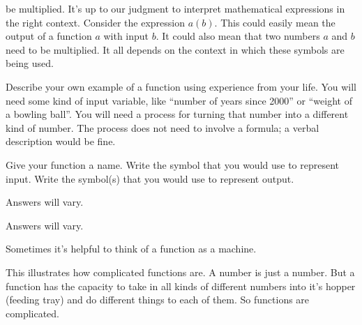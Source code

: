        		be multiplied. It's up to our judgment to interpret mathematical expressions in the
       		right context. Consider the expression $a(b)$. This could easily mean the output of
       		a function $a$ with input $b$. It could also mean that two numbers $a$ and $b$ need
       		to be multiplied. It all depends on the context in which these symbols are being used.
%
\begin{checkpoint}
\begin{problem}\label{}
Describe your own example of a function using experience from your life. You will need some 
                    kind of input variable, like ``number of years since 2000'' or ``weight of a bowling ball''. You will 
				need a process for turning that number into a different kind of number. The process does not need to
                		involve a formula; a verbal description would be fine.
%
\par Give your function a name. Write the symbol that you would use to represent
                		input. Write the symbol(s) that you would use to represent output.
%
\begin{longsolution}
%
Answers will vary.
%
\end{longsolution}
%
\begin{shortsolution}
%
Answers will vary.
%
\end{shortsolution}
%
\end{problem}
%
\end{checkpoint}
%
\par Sometimes it's helpful to think of a function as a machine.
%
\par This illustrates how complicated functions are. A number is just a number. But a function has the capacity to 
		take in all kinds of different numbers into it's hopper (feeding tray) and do different things to each of them. So
		functions are complicated.
%
\typeout{************************************************}
\typeout{************************************************}
%
